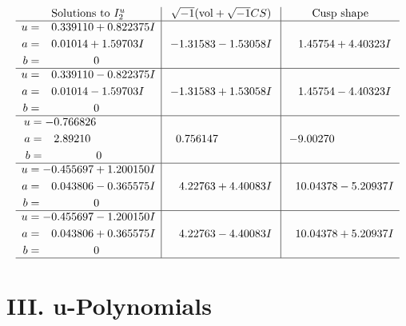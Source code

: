\documentclass[1p]{elsarticle_modified}
\theoremstyle{definition}
\newcommand{\I}{\sqrt{-1}}
\begin{document}
$$\begin{array}{c|c|c}  
\text{Solutions to }I^u_{2}& \I (\text{vol} + \sqrt{-1}CS) & \text{Cusp shape}\\
 \hline 
\begin{aligned}
u &= \phantom{-}0.339110 + 0.822375 I \\
a &= \phantom{-}0.01014 + 1.59703 I \\
b &= \phantom{-0.000000 } 0\end{aligned}
 & -1.31583 - 1.53058 I & \phantom{-}1.45754 + 4.40323 I \\ \hline\begin{aligned}
u &= \phantom{-}0.339110 - 0.822375 I \\
a &= \phantom{-}0.01014 - 1.59703 I \\
b &= \phantom{-0.000000 } 0\end{aligned}
 & -1.31583 + 1.53058 I & \phantom{-}1.45754 - 4.40323 I \\ \hline\begin{aligned}
u &= -0.766826\phantom{ +0.000000I} \\
a &= \phantom{-}2.89210\phantom{ +0.000000I} \\
b &= \phantom{-0.000000 } 0\end{aligned}
 & \phantom{-}0.756147\phantom{ +0.000000I} & -9.00270\phantom{ +0.000000I} \\ \hline\begin{aligned}
u &= -0.455697 + 1.200150 I \\
a &= \phantom{-}0.043806 - 0.365575 I \\
b &= \phantom{-0.000000 } 0\end{aligned}
 & \phantom{-}4.22763 + 4.40083 I & \phantom{-}10.04378 - 5.20937 I \\ \hline\begin{aligned}
u &= -0.455697 - 1.200150 I \\
a &= \phantom{-}0.043806 + 0.365575 I \\
b &= \phantom{-0.000000 } 0\end{aligned}
 & \phantom{-}4.22763 - 4.40083 I & \phantom{-}10.04378 + 5.20937 I\\
 \hline 
 \end{array}$$\newpage
\newpage\renewcommand{\arraystretch}{1}
\centering \section*{ III. u-Polynomials}
\end{document}
